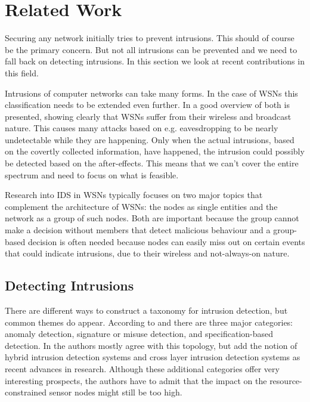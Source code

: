 \documentclass[conference]{IEEEtran}
\begin{document}
\section{Related Work}
\label{section:related}

Securing any network initially tries to prevent intrusions. This should of
course be the primary concern. But not all intrusions can be prevented and we
need to fall back on detecting intrusions. In this section we look at recent
contributions in this field.

Intrusions of computer networks can take many forms. In the case of WSNs this
classification needs to be extended even further. In
\cite{padmavathi2009survey} a good overview of both is presented, showing
clearly that WSNs suffer from their wireless and broadcast nature. This causes
many attacks based on e.g. eavesdropping to be nearly undetectable while they
are happening. Only when the actual intrusions, based on the covertly collected
information, have happened, the intrusion could possibly be detected based on
the after-effects. This means that we can't cover the entire spectrum and need
to focus on what is feasible.

Research into IDS in WSNs typically focuses on two major topics that complement
the architecture of WSNs: the nodes as single entities and the network as a
group of such nodes. Both are important because the group cannot make a
decision without members that detect malicious behaviour and a group-based
decision is often needed because nodes can easily miss out on certain events
that could indicate intrusions, due to their wireless and not-always-on nature.

\subsection{Detecting Intrusions}
\label{subsection:detecting}

There are different ways to construct a taxonomy for intrusion detection, but
common themes do appear. According to \cite{mishra2004intrusion} and
\cite{ioannis2007towards} there are three major categories: anomaly detection,
signature or misuse detection, and specification-based detection. In
\cite{alrajeh2013intrusion} the authors mostly agree with this topology, but
add the notion of hybrid intrusion detection systems and cross layer intrusion
detection systems as recent advances in research. Although these additional
categories offer very interesting prospects, the authors have to admit that the
impact on the resource-constrained sensor nodes might still be too high.
\end{document}

